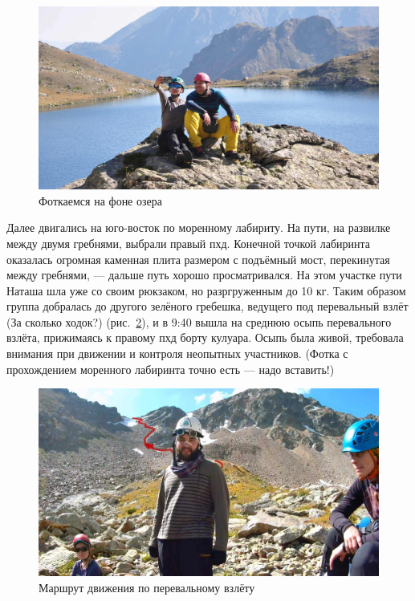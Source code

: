  
 \begin{figure}[h!]
 	\centering
 	\includegraphics[width=0.7\linewidth]{../pics/DSC_0907}
 	\caption{Фоткаемся на фоне озера}
 	\label{fig:DSC_0907}
 \end{figure}
 

Далее двигались на юго-восток по моренному лабириту. На пути, на развилке между двумя гребнями, выбрали правый пхд. Конечной точкой лабиринта оказалась огромная каменная плита размером с подъёмный мост, перекинутая между гребнями, --- дальше путь хорошо просматривался. На этом участке пути Наташа шла уже со своим рюкзаком, но разргруженным до 10 кг. Таким образом группа добралась до другого зелёного гребешка, ведущего под перевальный взлёт \alert{(За сколько ходок?)} (рис.~\ref{fig:20aug2.jpg}), и в 9:40 вышла на среднюю осыпь перевального взлёта, прижимаясь к правому пхд борту кулуара. Осыпь была живой, требовала внимания при движении и контроля неопытных участников. \alert{(Фотка с прохождением моренного лабиринта точно есть --- надо вставить!)}

\begin{figure}[h!]
	\centering
	\includegraphics[width=0.7\linewidth]{../pics/20aug2.jpg}
	\caption{Маршрут движения по перевальному взлёту}
	\label{fig:20aug2.jpg}
\end{figure}

